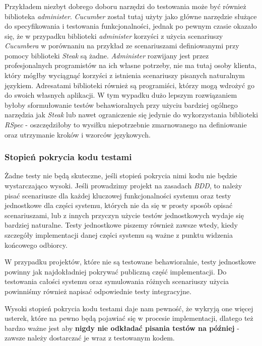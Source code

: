   \subsubsection{}
  Przykładem niezbyt dobrego doboru narzędzi do testowania może być również biblioteka \emph{administer}. \emph{Cucumber} został tutaj użyty jako główne narzędzie służące do specyfikowania i testowania funkcjonalności, jednak po pewnym czasie okazało się, że w przypadku biblioteki \emph{administer} korzyści z użycia scenariuszy \emph{Cucumbera} w porównaniu na przykład ze scenariuszami definiowanymi przy pomocy biblioteki \emph{Steak} są żadne. \emph{Administer} rozwijany jest przez profesjonalnych programistów na ich własne potrzeby, nie ma tutaj osoby klienta, który mógłby wyciągnąć korzyści z istnienia scenariuszy pisanych naturalnym językiem. Adresatami biblioteki również są programiści, którzy mogą wdrożyć go do swoich własnych aplikacji. W tym wypadku dużo lepszym rozwiązaniem byłoby sformułowanie testów behawioralnych przy użyciu bardziej ogólnego narzędzia jak \emph{Steak} lub nawet ograniczenie się jedynie do wykorzystania biblioteki \emph{RSpec} - oszczędziłoby to wysiłku niepotrzebnie zmarnowanego na definiowanie oraz utrzymanie kroków i wzorców językowych.
  
  \subsubsection{Stopień pokrycia kodu testami}
  Żadne testy nie będą skuteczne, jeśli stopień pokrycia nimi kodu nie będzie wystarczająco wysoki. Jeśli prowadzimy projekt na zasadach \emph{BDD}, to należy pisać scenariusze dla każdej kluczowej funkcjonalności systemu oraz testy jednostkowe dla części systemu, których nie da się w prosty sposób opisać scenariuszami, lub z innych przyczyn użycie testów jednostkowych wydaje się bardziej naturalne. Testy jednostkowe piszemy również zawsze wtedy, kiedy szczegóły implementacji danej części systemu są ważne z punktu widzenia końcowego odbiorcy.
  
  W przypadku projektów, które nie są testowane behawioralnie, testy jednostkowe powinny jak najdokładniej pokrywać publiczną część implementacji. Do testowania całości systemu oraz symulowania różnych scenariuszy użycia powinniśmy również napisać odpowiednie testy integracyjne.
  
  Wysoki stopień pokrycia kodu testami daje nam pewność, że wykryją one więcej usterek, które na pewno będą pojawiać się w procesie implementacji, dlatego też bardzo ważne jest aby \textbf{nigdy nie odkładać pisania testów na później} - zawsze należy dostarczać je wraz z testowanym kodem.
  
